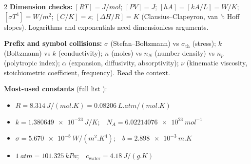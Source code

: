 \begin{multicols}{2}
\textbf{Dimension checks:} $[R T]=\si{J/mol}$; $[PV]=\si{J}$; $[hA]=[kA/L]=\si{W/K}$; $[\sigma T^4]=\si{W/m^2}$; $[C/K]=\si{s}$; $[\Delta H/R]=\si{K}$ (Clausius--Clapeyron, van 't Hoff slopes). Logarithms and exponentials need dimensionless arguments.

\textbf{Prefix and symbol collisions:} $\sigma$ (Stefan--Boltzmann) vs $\sigma_{\text{th}}$ (stress); $k$ (Boltzmann) vs $k$ (conductivity); $n$ (moles) vs $n_N$ (number density) vs $n_p$ (polytropic index); $\alpha$ (expansion, diffusivity, absorptivity); $\nu$ (kinematic viscosity, stoichiometric coefficient, frequency). Read the context.

\textbf{Most-used constants} (full list ):
\begin{itemize}
\item $R=\SI{8.314}{J/(mol.K)}=\SI{0.08206}{L.atm/(mol.K)}$
\item $k=\SI{1.380649e-23}{J/K}$;\ \ $N_A=\SI{6.02214076e23}{mol^{-1}}$
\item $\sigma=\SI{5.670e-8}{W/(m^2.K^4)}$;\ \ $b=\SI{2.898e-3}{m.K}$
\item $\SI{1}{atm}=\SI{101.325}{kPa}$;\ \ $c_{\text{water}}=\SI{4.18}{J/(g.K)}$
\end{itemize}
\end{multicols}
